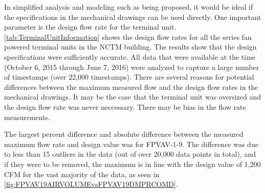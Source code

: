 In simplified analysis and modeling such as being proposed, it would be ideal if the specifications in the mechanical drawings can be used directly. One important parameter is the design flow rate for the terminal unit. \tableref \ref{tab:TerminalUnitInformation} shows the design flow rates for all the series fan powered terminal units in the NCTM building. The results show that the design specifications were sufficiently accurate.  All data that were available at the time (October 6, 2015 through June 7, 2016) were analyzed to capture a large number of timestamps (over 22,000 timestamps). There are several reasons for potential differences between the maximum measured flow and the design flow rates in the mechanical drawings. It may be the case that the terminal unit was oversized and the design flow rate was never neccessary. There may be bias in the flow rate measurements.  

The largest percent difference and absolute difference between the measured maximum flow rate and design value was for FPVAV-1-9. The difference was due to less than 15 outliers in the data (out of over 20,000 data points in total), and if they were to be removed, the maximum is in line with the design value of 1,200 CFM for the vast majority of the data, as seen in \figref{} \ref{fig:FPVAV19AIRVOLUMEvsFPVAV19DMPRCOMD}. 


